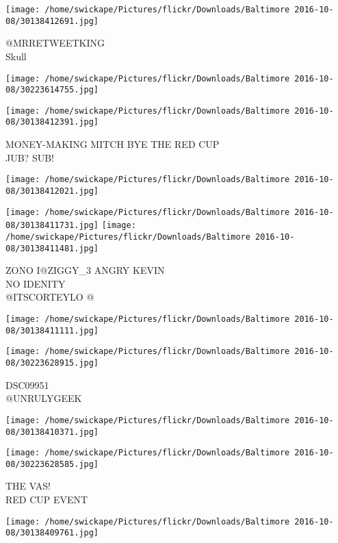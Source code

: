 \documentclass[10pt,letterpaper]{article}
\begin{document}
\vspace{0.25in}
\texttt{[image: /home/swickape/Pictures/flickr/Downloads/Baltimore 2016-10-08/30138412691.jpg]}

@MRRETWEETKING\\
Skull
\pagebreak

\texttt{[image: /home/swickape/Pictures/flickr/Downloads/Baltimore 2016-10-08/30223614755.jpg]}

\vspace{0.25in}
\texttt{[image: /home/swickape/Pictures/flickr/Downloads/Baltimore 2016-10-08/30138412391.jpg]}

MONEY{-}MAKING MITCH BYE THE RED CUP\\
JUB? SUB!
\pagebreak

\texttt{[image: /home/swickape/Pictures/flickr/Downloads/Baltimore 2016-10-08/30138412021.jpg]}

\vspace{0.25in}
\texttt{[image: /home/swickape/Pictures/flickr/Downloads/Baltimore 2016-10-08/30138411731.jpg]}
\texttt{[image: /home/swickape/Pictures/flickr/Downloads/Baltimore 2016-10-08/30138411481.jpg]}

ZONO I@ZIGGY\_3 ANGRY KEVIN\\
NO IDENITY\\
@ITSCORTEYLO @
\pagebreak

\texttt{[image: /home/swickape/Pictures/flickr/Downloads/Baltimore 2016-10-08/30138411111.jpg]}

\vspace{0.25in}
\texttt{[image: /home/swickape/Pictures/flickr/Downloads/Baltimore 2016-10-08/30223628915.jpg]}

DSC09951\\
@UNRULYGEEK
\pagebreak

\texttt{[image: /home/swickape/Pictures/flickr/Downloads/Baltimore 2016-10-08/30138410371.jpg]}

\vspace{0.25in}
\texttt{[image: /home/swickape/Pictures/flickr/Downloads/Baltimore 2016-10-08/30223628585.jpg]}

THE VAS!\\
RED CUP EVENT
\pagebreak

\texttt{[image: /home/swickape/Pictures/flickr/Downloads/Baltimore 2016-10-08/30138409761.jpg]}
\end{document}

